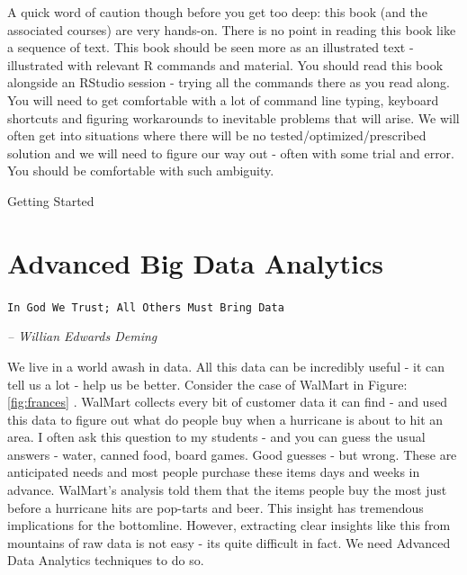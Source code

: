 \documentclass[10pt, letterpaper, twoside]{memoir}\usepackage{knitr}
\makeatletter
\newcommand{\chapterendsymbol}{
    \vspace{24pt}
    \Huge
    \hrulefill \hspace{0.1in} \hspace{0.1in} \hrulefill
    \normalsize
    }
\renewcommand\part{%
  \if@openright
    \cleardoublepage
  \else
    \clearpage
  \fi
  \thispagestyle{empty}
  \null\vfil
  \secdef\@part\@spart
  }
\makeatother
\begin{document}
A quick word of caution though before you get too deep: this book (and the associated courses) are very hands-on. There is no point in reading this book like a sequence of text. This book should be seen more as an illustrated text - illustrated with relevant R commands and material. You should read this book alongside an RStudio session - trying all the commands there as you read along. You will need to get comfortable with a lot of command line typing, keyboard shortcuts and figuring workarounds to inevitable problems that will arise. We will often get into situations where there will be no tested/optimized/prescribed solution and we will need to figure our way out - often with some trial and error. You should be comfortable with such ambiguity.

\chapterendsymbol


\mainmatter
\pagestyle{myruled}


\part{Getting Started}




\chapter{Advanced Big Data Analytics}

\begin{flushright}
\texttt{In God We Trust; All Others Must Bring Data}

\emph{-- Willian Edwards Deming}
\end{flushright}

\vspace{12pt}

We live in a world awash in data. All this data can be incredibly useful - it can tell us a lot - help us be better. Consider the case of WalMart in Figure: \ref{fig:frances} \citep{WhatT45:online}. WalMart collects every bit of customer data it can find - and used this data to figure out what do people buy when a hurricane is about to hit an area. I often ask this question to my students - and you can guess the usual answers - water, canned food, board games. Good guesses - but wrong. These are anticipated needs and most people purchase these items days and weeks in advance. WalMart's analysis told them that the items people buy the most just before a hurricane hits are  pop-tarts and beer. This insight has tremendous implications for the bottomline. However, extracting clear insights like this from mountains of raw data is not easy - its quite difficult in fact. We need Advanced Data Analytics techniques to do so.  
\end{document}
